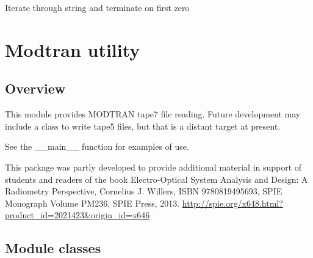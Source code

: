 \documentclass[a4paper,10pt,english]{sphinxmanual}
\begin{document}

\begin{fulllineitems}
\label{ryptw:pyradi.ryptw.mybyte}
\end{fulllineitems}


\begin{fulllineitems}
\label{ryptw:pyradi.ryptw.mydouble}
\end{fulllineitems}


\begin{fulllineitems}
\label{ryptw:pyradi.ryptw.terminateStrOnZero}
Iterate through string and terminate on first zero

\end{fulllineitems}



\chapter{Modtran utility}
\label{rymodtran:modtran-utility}\label{rymodtran::doc}

\section{Overview}
\label{rymodtran:module-pyradi.rymodtran}\label{rymodtran:overview}
This module provides MODTRAN tape7 file reading.
Future development may include a class to write tape5 files, but that is 
a distant target at present.

See the \_\_main\_\_ function for examples of use.

This package was partly developed to provide additional material in support of students 
and readers of the book Electro-Optical System Analysis and Design: A Radiometry 
Perspective,  Cornelius J. Willers, ISBN 9780819495693, SPIE Monograph Volume
PM236, SPIE Press, 2013.  \href{http://spie.org/x648.html?product\_id=2021423\&origin\_id=x646}{http://spie.org/x648.html?product\_id=2021423\&origin\_id=x646}


\section{Module classes}
\label{rymodtran:module-classes}
\end{document}
